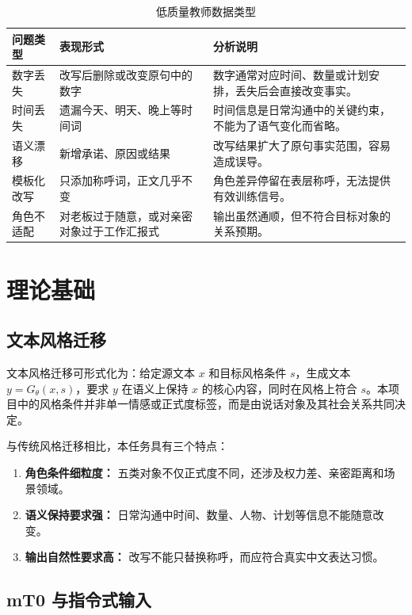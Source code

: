 \documentclass[12pt,a4paper]{ctexart}
\begin{document}
\begin{table}[H]
\centering
\caption{低质量教师数据类型}
\label{tab:bad_teacher_examples}
\begin{tabular}{p{3cm}|p{4cm}|p{5cm}}
\toprule
问题类型 & 表现形式 & 分析说明 \\
\midrule
数字丢失 & 改写后删除或改变原句中的数字 & 数字通常对应时间、数量或计划安排，丢失后会直接改变事实。 \\
时间丢失 & 遗漏今天、明天、晚上等时间词 & 时间信息是日常沟通中的关键约束，不能为了语气变化而省略。 \\
语义漂移 & 新增承诺、原因或结果 & 改写结果扩大了原句事实范围，容易造成误导。 \\
模板化改写 & 只添加称呼词，正文几乎不变 & 角色差异停留在表层称呼，无法提供有效训练信号。 \\
角色不适配 & 对老板过于随意，或对亲密对象过于工作汇报式 & 输出虽然通顺，但不符合目标对象的关系预期。 \\
\bottomrule
\end{tabular}
\end{table}

\section{理论基础}

\subsection{文本风格迁移}

文本风格迁移可形式化为：给定源文本 $x$ 和目标风格条件 $s$，生成文本 $y=G_\theta(x,s)$，要求 $y$ 在语义上保持 $x$ 的核心内容，同时在风格上符合 $s$。本项目中的风格条件并非单一情感或正式度标签，而是由说话对象及其社会关系共同决定。

与传统风格迁移相比，本任务具有三个特点：

\begin{enumerate}[leftmargin=2em]
  \item \textbf{角色条件细粒度：} 五类对象不仅正式度不同，还涉及权力差、亲密距离和场景领域。
  \item \textbf{语义保持要求强：} 日常沟通中时间、数量、人物、计划等信息不能随意改变。
  \item \textbf{输出自然性要求高：} 改写不能只替换称呼，而应符合真实中文表达习惯。
\end{enumerate}

\subsection{mT0 与指令式输入}
\end{document}
